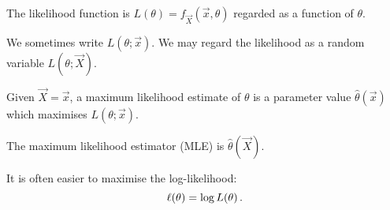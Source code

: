 \begin{definition}
  The likelihood function is $L(\theta) = f_{\vec{X}}(\vec{x}, \theta)$ regarded as a function of $\theta$.
\end{definition}

We sometimes write $L(\theta; \vec{x})$. We may regard the likelihood as a random variable $L(\theta; \vec{X})$.

\begin{definition}
  Given $\vec{X} = \vec{x}$, a maximum likelihood estimate of $\theta$ is a parameter value $\hat{\theta}(\vec{x})$ which maximises $L(\theta; \vec{x})$.

  The maximum likelihood estimator (MLE) is $\hat{\theta}(\vec{X})$.
\end{definition}

It is often easier to maximise the log-likelihood:
\[
\ell(\theta) = \log L(\theta) \, {.}
\]


